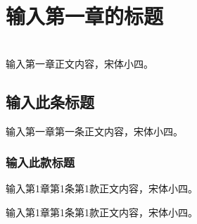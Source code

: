 
\newpage




\section{输入第一章的标题} %

    ~\\

    \song{}
    输入第一章正文内容，宋体小四。  


    \subsection{输入此条标题} %

        输入第一章第一条正文内容，宋体小四。

        \subsubsection{输入此款标题} %

            输入第1章第1条第1款正文内容，宋体小四。


                输入第1章第1条第1款正文内容，宋体小四。



